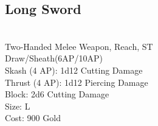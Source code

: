 \subsection{Long Sword}\label{weapon:longSword}\\
Two-Handed Melee Weapon,  Reach, ST\\
Draw/Sheath(6AP/10AP)\\
Skash (4 AP): 1d12 Cutting Damage\\
Thrust (4 AP): 1d12 Piercing Damage\\
Block: 2d6 Cutting Damage\\
Size: L\\
Cost: 900 Gold\\